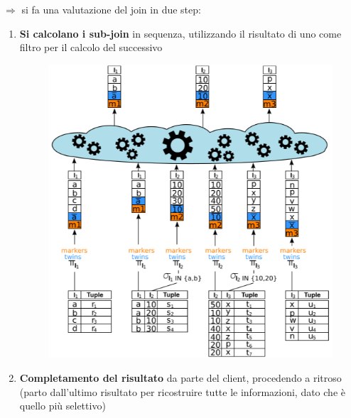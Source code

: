 \documentclass{report}
\begin{document}
\noindent $\Rightarrow$ si fa una valutazione del join in due step:
\begin{enumerate}
    \item \textbf{Si calcolano i sub-join} in sequenza, utilizzando il risultato di uno come filtro per il calcolo del successivo 
    
    \begin{figure}[H]
        \centering
        \includegraphics[width=1\linewidth]{images/step1.png}
    \end{figure}

    \item \textbf{Completamento del risultato} da parte del client, procedendo a ritroso (parto dall'ultimo risultato 
    per ricostruire tutte le informazioni, dato che è quello più selettivo)


\end{enumerate}
\end{document}
